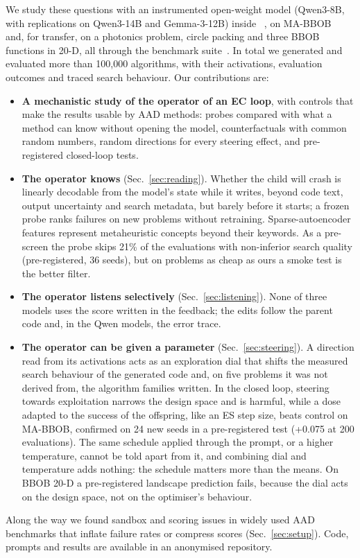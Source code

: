We study these questions with an instrumented open-weight model
(Qwen3-8B, with replications on Qwen3-14B and Gemma-3-12B) inside
\llamea~\cite{vanstein2025llamea}, on MA-BBOB~\cite{vermetten2025mabbob}
and, for transfer, on a photonics problem, circle packing and three BBOB
functions in 20-D, all through the \blade benchmark
suite~\cite{blade2025}. In total we generated and evaluated more than
100,000 algorithms, with their activations, evaluation outcomes and
traced search behaviour. Our contributions are:
\begin{itemize}
  \item \textbf{A mechanistic study of the operator of an EC loop}, with
    controls that make the results usable by AAD methods: probes
    compared with what a method can know without opening the model,
    counterfactuals with common random numbers, random directions for
    every steering effect, and pre-registered closed-loop tests.
  \item \textbf{The operator knows} (Sec.~\ref{sec:reading}). Whether the
    child will crash is linearly decodable from the model's state while
    it writes, beyond code text, output uncertainty and search metadata,
    but barely before it starts; a frozen probe ranks failures on new
    problems without retraining. Sparse-autoencoder features represent
    metaheuristic concepts beyond their keywords. As a pre-screen the
    probe skips 21\% of the evaluations with non-inferior search quality
    (pre-registered, 36 seeds), but on problems as cheap as ours a smoke
    test is the better filter.
  \item \textbf{The operator listens selectively}
    (Sec.~\ref{sec:listening}). None of three models uses the score
    written in the feedback; the edits follow the parent code and, in the
    Qwen models, the error trace.
  \item \textbf{The operator can be given a parameter}
    (Sec.~\ref{sec:steering}). A direction read from its activations
    acts as an exploration dial that shifts the measured search behaviour
    of the generated code and, on five problems it was not derived from,
    the algorithm families written. In the closed loop, steering towards
    exploitation narrows the design space and is harmful, while a dose
    adapted to the success of the offspring, like an ES step size,
    beats control on MA-BBOB, confirmed on 24 new seeds in a
    pre-registered test (+0.075 \aocc at 200 evaluations). The same
    schedule applied through the prompt, or a higher temperature, cannot
    be told apart from it, and combining dial and temperature adds
    nothing: the schedule matters more than the means. On BBOB 20-D a
    pre-registered landscape prediction fails, because the dial acts on
    the design space, not on the optimiser's behaviour.
\end{itemize}
Along the way we found sandbox and scoring issues in widely used AAD
benchmarks that inflate failure rates or compress scores
(Sec.~\ref{sec:setup}). Code, prompts and results are available in an
anonymised repository.
